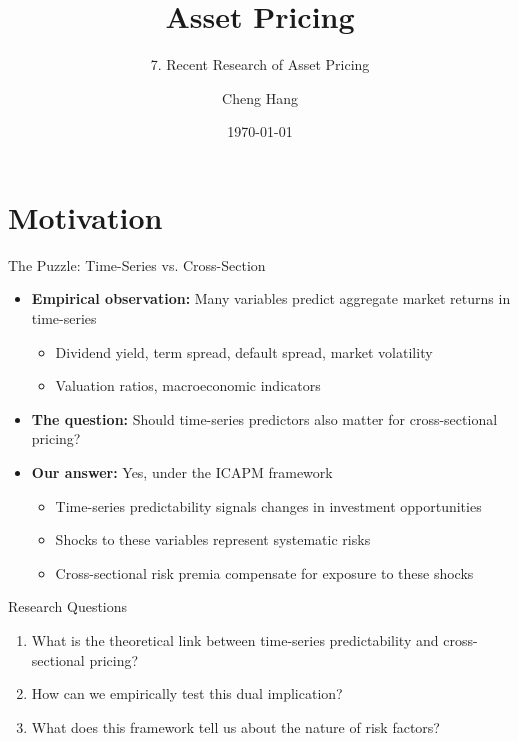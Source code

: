 \documentclass{beamer}
\title[Asset Pricing]{\textbf{Asset Pricing}} %
\subtitle{7. Recent Research of Asset Pricing}
\author[Cheng Hang]{Cheng Hang} %
\institute[DUFE] 
{School of Fintech \\
Dongbei University of Finance \& Economics \\ 
\medskip
\textbf{chenghangch@qq.com}
}
\date{\today}
\begin{document}
\begin{frame}
\titlepage %
\end{frame}



\section{Motivation}

\begin{frame}{The Puzzle: Time-Series vs. Cross-Section}
\begin{itemize}
\item \textbf{Empirical observation:} Many variables predict aggregate market returns in time-series
\begin{itemize}
\item Dividend yield, term spread, default spread, market volatility
\item Valuation ratios, macroeconomic indicators
\end{itemize}
\vspace{0.3cm}
\item \textbf{The question:} Should time-series predictors also matter for cross-sectional pricing?
\vspace{0.3cm}
\item \textbf{Our answer:} Yes, under the ICAPM framework
\begin{itemize}
\item Time-series predictability signals changes in investment opportunities
\item Shocks to these variables represent systematic risks
\item Cross-sectional risk premia compensate for exposure to these shocks
\end{itemize}
\end{itemize}
\end{frame}

\begin{frame}{Research Questions}
\begin{enumerate}
\item What is the theoretical link between time-series predictability and cross-sectional pricing?
\vspace{0.3cm}
\item How can we empirically test this dual implication?
\vspace{0.3cm}
\item What does this framework tell us about the nature of risk factors?
\end{enumerate}
\end{frame}
\end{document}
